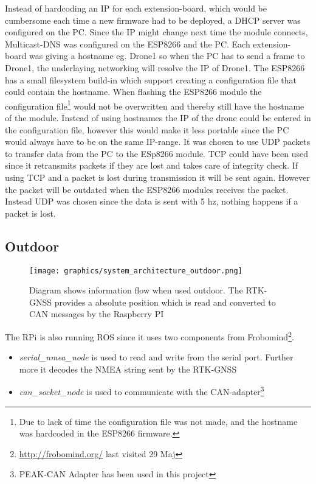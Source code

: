 Instead of hardcoding an  \ac{IP} for each extension-board, which would be cumbersome each time a new firmware had to be deployed, a \ac{DHCP} server was configured on the PC. Since the IP might change next time the module connects, Multicast-DNS was configured on the ESP8266 and the PC. Each extension-board was giving a hostname eg. Drone1 so when the PC has to send a frame to Drone1, the underlaying networking will resolve the IP of Drone1.
The ESP8266 has a small filesystem build-in which support creating a configuration file that could contain the hostname.
When flashing the ESP8266 module the configuration file\footnote{Due to lack of time the configuration file was not made, and the hostname was hardcoded in the ESP8266 firmware.} would not be overwritten and thereby still have the hostname of the module. Instead of using hostnames the \ac{IP} of the drone could be entered in the configuration file, however this would make it less portable since the PC would always have to be on the same \ac{IP}-range. It was chosen to use \ac{UDP} packets to transfer data from the PC to the ESp8266 module. \ac{TCP} could have been used since it retransmits packets if they are lost and takes care of integrity check. If using \ac{TCP} and a packet is lost during transmission it will be sent again. However the packet will be outdated when the ESP8266 modules receives the packet. Instead \ac{UDP} was chosen since the data is sent with 5 hz, nothing happens if a packet is lost.


\subsection{Outdoor}
\begin{figure}[H]
    \center
    \texttt{[image: graphics/system\_architecture\_outdoor.png]}
    \caption{Diagram shows information flow when used outdoor. The RTK-GNSS provides a absolute position which is read and converted to CAN messages by the Raspberry PI}
    \label{fig:outdoor_information_flow}
\end{figure}

The \ac{RPi} is also running \ac{ROS} since it uses two components from Frobomind\footnote{\url {http://frobomind.org/} last visited 29 Maj}. \begin{itemize}
	\item \textit{serial\_nmea\_node} is used to read and write from the serial port. Further more it decodes the NMEA string sent by the \ac{RTK-GNSS}
	\item \textit{can\_socket\_node} is used to communicate with the \ac{CAN}-adapter\footnote{PEAK-CAN Adapter has been used in this project}
\end{itemize}

